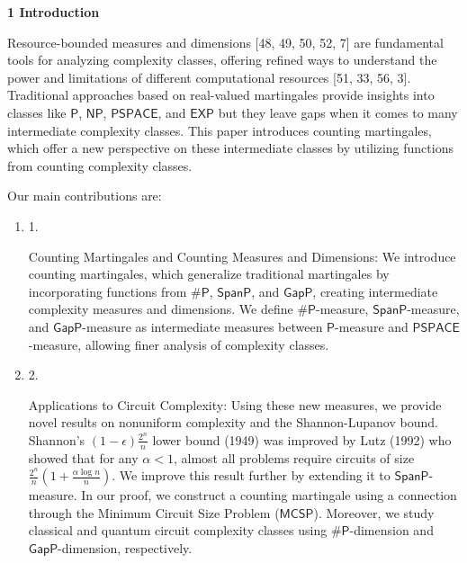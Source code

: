 

\par\medskip\noindent\textbf{
1 Introduction}\par




Resource-bounded measures and dimensions [48, 49, 50, 52, 7] are fundamental tools for analyzing complexity classes, offering refined ways to understand the power and limitations of different computational resources [51, 33, 56, 3].
Traditional approaches based on real-valued martingales provide insights into classes like $\mathsf{P}$, $\mathsf{NP}$, $\mathsf{PSPACE}$, and $\mathsf{EXP}$ but they leave gaps when it comes to many intermediate complexity classes. This paper introduces counting martingales, which offer a new perspective on these intermediate classes by utilizing functions from counting complexity classes.\par




Our main contributions are:\par


\begin{enumerate}


\item[] 
1. 


Counting Martingales and Counting Measures and Dimensions: We introduce counting martingales, which generalize traditional martingales by incorporating functions from ${\mathsf{\#}\mathsf{P}}$, $\mathsf{SpanP}$, and $\mathsf{GapP}$, creating intermediate complexity measures and dimensions. We define ${\mathsf{\#}\mathsf{P}}$-measure, $\mathsf{SpanP}$-measure, and $\mathsf{GapP}$-measure as intermediate measures between $\mathsf{P}$-measure and $\mathsf{PSPACE}$-measure, allowing finer analysis of complexity classes.\par





\item[] 
2. 


Applications to Circuit Complexity: Using these new measures, we provide novel results on nonuniform complexity and the Shannon-Lupanov bound. Shannon’s $(1-\epsilon)\frac{2^{n}}{n}$ lower bound (1949) was improved by Lutz (1992) who showed that for any $\alpha<1$, almost all problems require circuits of size $\frac{2^{n}}{n}\!\left(1+\frac{\alpha\log n}{n}\right)$. We improve this result further by extending it to $\mathsf{SpanP}$-measure. In our proof, we construct a counting martingale using a connection through the Minimum Circuit Size Problem ($\mathsf{MCSP}$). Moreover, we study classical and quantum circuit complexity classes using ${\mathsf{\#}\mathsf{P}}$-dimension and $\mathsf{GapP}$-dimension, respectively.\par





\end{enumerate}




